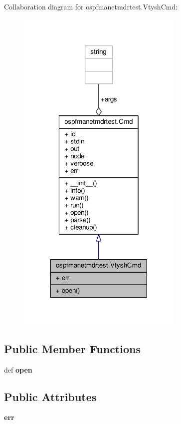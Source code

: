 Collaboration diagram for ospfmanetmdrtest.\+Vtysh\+Cmd\+:
\nopagebreak
\begin{figure}[H]
\begin{center}
\leavevmode
\includegraphics[width=225pt]{classospfmanetmdrtest_1_1_vtysh_cmd__coll__graph}
\end{center}
\end{figure}
\subsection*{Public Member Functions}
\begin{DoxyCompactItemize}
\item 
\hypertarget{classospfmanetmdrtest_1_1_vtysh_cmd_adc3224bb5e02f2c354a873ebba1f069a}{def {\bfseries open}}\label{classospfmanetmdrtest_1_1_vtysh_cmd_adc3224bb5e02f2c354a873ebba1f069a}

\end{DoxyCompactItemize}
\subsection*{Public Attributes}
\begin{DoxyCompactItemize}
\item 
\hypertarget{classospfmanetmdrtest_1_1_vtysh_cmd_a9289ee3baeda01d7135ad47796e8a192}{{\bfseries err}}\label{classospfmanetmdrtest_1_1_vtysh_cmd_a9289ee3baeda01d7135ad47796e8a192}

\end{DoxyCompactItemize}
